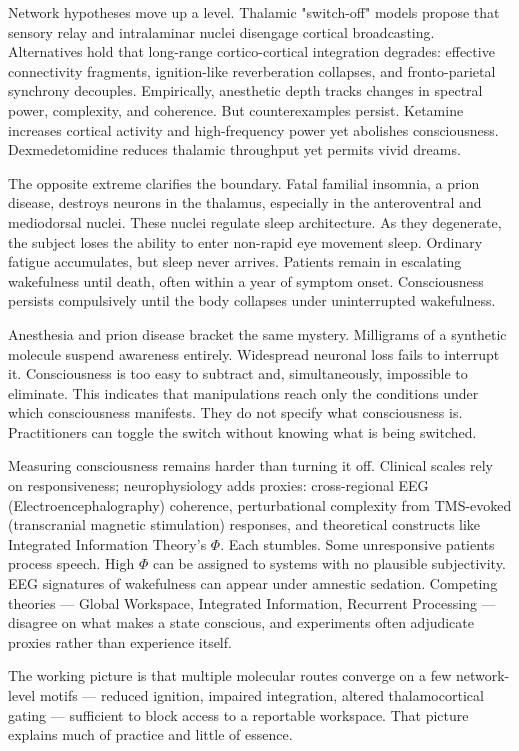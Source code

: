 Network hypotheses move up a level. Thalamic "switch-off" models propose that sensory relay and intralaminar nuclei disengage cortical broadcasting. Alternatives hold that long-range cortico-cortical integration degrades: effective connectivity fragments, ignition-like reverberation collapses, and fronto-parietal synchrony decouples. Empirically, anesthetic depth tracks changes in spectral power, complexity, and coherence. But counterexamples persist. Ketamine increases cortical activity and high-frequency power yet abolishes consciousness. Dexmedetomidine reduces thalamic throughput yet permits vivid dreams.

The opposite extreme clarifies the boundary. Fatal familial insomnia, a prion disease, destroys neurons in the thalamus, especially in the anteroventral and mediodorsal nuclei. These nuclei regulate sleep architecture. As they degenerate, the subject loses the ability to enter non-rapid eye movement sleep. Ordinary fatigue accumulates, but sleep never arrives. Patients remain in escalating wakefulness until death, often within a year of symptom onset. Consciousness persists compulsively until the body collapses under uninterrupted wakefulness.

Anesthesia and prion disease bracket the same mystery. Milligrams of a synthetic molecule suspend awareness entirely. Widespread neuronal loss fails to interrupt it. Consciousness is too easy to subtract and, simultaneously, impossible to eliminate. This indicates that manipulations reach only the conditions under which consciousness manifests. They do not specify what consciousness is. Practitioners can toggle the switch without knowing what is being switched.

Measuring consciousness remains harder than turning it off. Clinical scales rely on responsiveness; neurophysiology adds proxies: cross-regional EEG (Electroencephalography) coherence, perturbational complexity from TMS-evoked (transcranial magnetic stimulation) responses, and theoretical constructs like Integrated Information Theory's $\Phi$. Each stumbles. Some unresponsive patients process speech. High $\Phi$ can be assigned to systems with no plausible subjectivity. EEG signatures of wakefulness can appear under amnestic sedation. Competing theories — Global Workspace, Integrated Information, Recurrent Processing — disagree on what makes a state conscious, and experiments often adjudicate proxies rather than experience itself.

The working picture is that multiple molecular routes converge on a few network-level motifs — reduced ignition, impaired integration, altered thalamocortical gating — sufficient to block access to a reportable workspace. That picture explains much of practice and little of essence.

